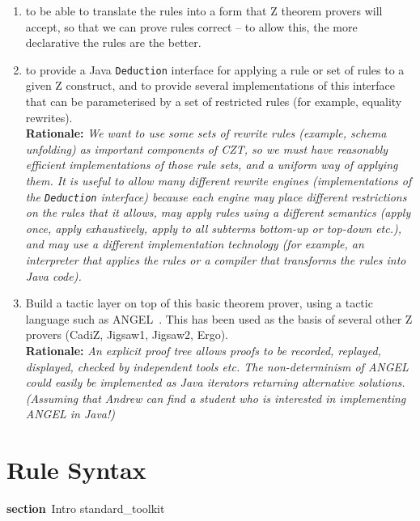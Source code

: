 \documentclass{article}
\newenvironment{Rationale}{\\ \textbf{Rationale:}\it}{}
\newenvironment{zsection}{\begin{zed}}{\end{zed}}
\newcommand{\SECTION}{\textbf{section}~}
\newcommand{\parents}{\mathrel{\textbf{parents}}}
\begin{document}
\begin{enumerate}
\item to be able to translate the rules into a form that Z theorem 
  provers will accept, so that we can prove rules correct -- to allow this,
  the more declarative the rules are the better.

\item to provide a Java \texttt{Deduction} interface for applying a rule or
  set of rules to a given Z construct, and to provide several
  implementations of this interface that can be parameterised by a set
  of restricted rules (for example, equality rewrites).
  \begin{Rationale} 
  We want to use some sets of rewrite rules
  (example, schema unfolding) as important components of CZT, so we
  must have reasonably efficient implementations of those rule sets,
  and a uniform way of applying them.  It is useful to allow many
  different rewrite engines (implementations of the \texttt{Deduction}
  interface) because each engine may place different restrictions on
  the rules that it allows, may apply rules using a different
  semantics (apply once, apply exhaustively, apply to all subterms
  bottom-up or top-down etc.), and may use a different implementation
  technology (for example, an interpreter that applies the rules or a
  compiler that transforms the rules into Java code).
  \end{Rationale}

\item Build a tactic layer on top of this basic theorem prover,
  using a tactic language such as
  ANGEL~\cite{martin:tactics}.  This has been used as the basis
  of several other Z provers (CadiZ, Jigsaw1, Jigsaw2, Ergo).
  \begin{Rationale}
    An explicit proof tree allows proofs to be recorded, replayed,
    displayed, checked by independent tools etc.
    The non-determinism of ANGEL could easily be implemented as
    Java iterators returning alternative solutions.
    (Assuming that Andrew can find a student who is interested 
    in implementing ANGEL in Java!)
  \end{Rationale}
\end{enumerate}


\section{Rule Syntax}

\begin{zsection}
  \SECTION Intro \parents standard\_toolkit
\end{zsection}
\end{document}
